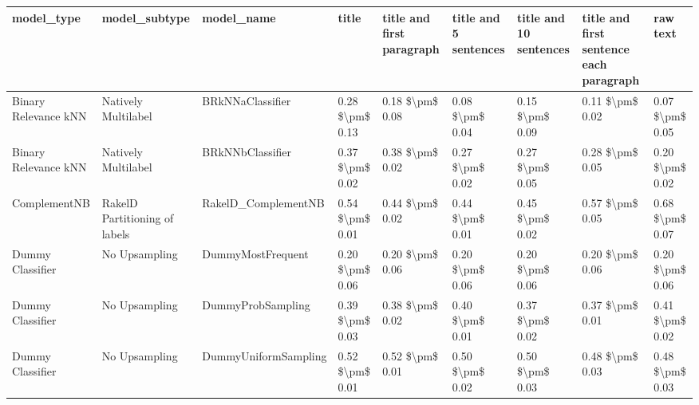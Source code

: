 \begin{tabular}{lllllllll}
\toprule
                     model\_type &                 model\_subtype &                                   model\_name &           title & title and first paragraph & title and 5 sentences & title and 10 sentences & title and first sentence each paragraph &        raw text \\
\midrule
           Binary Relevance kNN &           Natively Multilabel &                             BRkNNaClassifier & 0.28 \$\textbackslash pm\$ 0.13 &           0.18 \$\textbackslash pm\$ 0.08 &       0.08 \$\textbackslash pm\$ 0.04 &        0.15 \$\textbackslash pm\$ 0.09 &                         0.11 \$\textbackslash pm\$ 0.02 & 0.07 \$\textbackslash pm\$ 0.05 \\
           Binary Relevance kNN &           Natively Multilabel &                             BRkNNbClassifier & 0.37 \$\textbackslash pm\$ 0.02 &           0.38 \$\textbackslash pm\$ 0.02 &       0.27 \$\textbackslash pm\$ 0.02 &        0.27 \$\textbackslash pm\$ 0.05 &                         0.28 \$\textbackslash pm\$ 0.05 & 0.20 \$\textbackslash pm\$ 0.02 \\
                   ComplementNB & RakelD Partitioning of labels &                          RakelD\_ComplementNB & 0.54 \$\textbackslash pm\$ 0.01 &           0.44 \$\textbackslash pm\$ 0.02 &       0.44 \$\textbackslash pm\$ 0.01 &        0.45 \$\textbackslash pm\$ 0.02 &                         0.57 \$\textbackslash pm\$ 0.05 & 0.68 \$\textbackslash pm\$ 0.07 \\
               Dummy Classifier &                 No Upsampling &                            DummyMostFrequent & 0.20 \$\textbackslash pm\$ 0.06 &           0.20 \$\textbackslash pm\$ 0.06 &       0.20 \$\textbackslash pm\$ 0.06 &        0.20 \$\textbackslash pm\$ 0.06 &                         0.20 \$\textbackslash pm\$ 0.06 & 0.20 \$\textbackslash pm\$ 0.06 \\
               Dummy Classifier &                 No Upsampling &                            DummyProbSampling & 0.39 \$\textbackslash pm\$ 0.03 &           0.38 \$\textbackslash pm\$ 0.02 &       0.40 \$\textbackslash pm\$ 0.01 &        0.37 \$\textbackslash pm\$ 0.02 &                         0.37 \$\textbackslash pm\$ 0.01 & 0.41 \$\textbackslash pm\$ 0.02 \\
               Dummy Classifier &                 No Upsampling &                         DummyUniformSampling & 0.52 \$\textbackslash pm\$ 0.01 &           0.52 \$\textbackslash pm\$ 0.01 &       0.50 \$\textbackslash pm\$ 0.02 &        0.50 \$\textbackslash pm\$ 0.03 &                         0.48 \$\textbackslash pm\$ 0.03 & 0.48 \$\textbackslash pm\$ 0.03 \\

\end{tabular}
